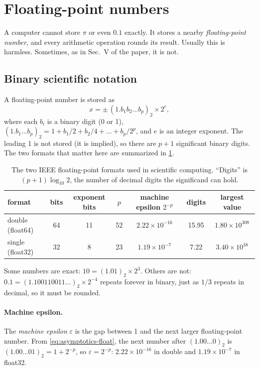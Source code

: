 \section{Floating-point numbers}\label{sec:asymptotics-float}

A computer cannot store $\pi$ or even $0.1$ exactly. It stores a nearby \emph{floating-point number}, and every arithmetic operation rounds its result. Usually this is harmless. Sometimes, as in Sec.~V of the paper, it is not.

\subsection{Binary scientific notation}

A floating-point number is stored as
\begin{equation}
x=\pm\,(1.b_1b_2\ldots b_p)_2\times2^{e},
\label{eq:asymptotics-float}
\end{equation}
where each $b_i$ is a binary digit (0 or 1), $(1.b_1\ldots b_p)_2=1+b_1/2+b_2/4+\dots+b_p/2^p$, and $e$ is an integer exponent. The leading 1 is not stored (it is implied), so there are $p+1$ significant binary digits. The two formats that matter here are summarized in \cref{tab:asymptotics-formats}.

\begin{table}[htbp]\centering
\caption{The two IEEE floating-point formats used in scientific computing. ``Digits'' is $(p+1)\log_{10}2$, the number of decimal digits the significand can hold.}
\label{tab:asymptotics-formats}
\begin{tabular}{lcccccc}
\toprule
format & bits & exponent bits & $p$ & machine epsilon $2^{-p}$ & digits & largest value\\
\midrule
double (float64) & 64 & 11 & 52 & $2.22\times10^{-16}$ & 15.95 & $1.80\times10^{308}$\\
single (float32) & 32 & 8 & 23 & $1.19\times10^{-7}$ & 7.22 & $3.40\times10^{38}$\\
\bottomrule
\end{tabular}
\end{table}

Some numbers are exact: $10=(1.01)_2\times2^3$. Others are not: $0.1=(1.100110011\ldots)_2\times2^{-4}$ repeats forever in binary, just as $1/3$ repeats in decimal, so it must be rounded.

\paragraph{Machine epsilon.} The \emph{machine epsilon} $\varepsilon$ is the gap between 1 and the next larger floating-point number. From \cref{eq:asymptotics-float}, the next number after $(1.00\ldots0)_2$ is $(1.00\ldots01)_2=1+2^{-p}$, so $\varepsilon=2^{-p}$: $2.22\times10^{-16}$ in double and $1.19\times10^{-7}$ in float32.

